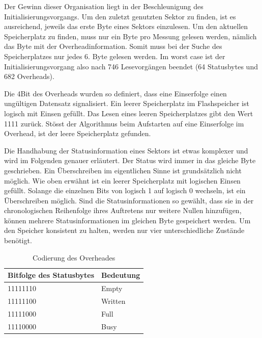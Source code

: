 Der Gewinn dieser Organisation liegt in der Beschleunigung des Initialisierungsvorgangs. Um den zuletzt genutzten Sektor zu finden, ist es ausreichend, jeweils das erste Byte eines Sektors einzulesen. Um den aktuellen Speicherplatz zu finden, muss nur ein Byte pro Messung gelesen werden, nämlich das Byte mit der Overheadinformation. Somit muss bei der Suche des Speicherplatzes nur jedes 6. Byte gelesen werden. Im \glqq worst case\grqq{}  ist der Initialisierungsvorgang also nach 746 Lesevorgängen beendet (64 Statusbytes und 682 Overheads).

Die 4Bit des Overheads wurden so definiert, dass eine Einserfolge einen ungültigen Datensatz signalisiert. Ein leerer Speicherplatz im Flashspeicher ist logisch mit Einsen gefüllt. Das Lesen eines leeren Speicherplatzes gibt den Wert  1111\grqq{}   zurück. Stösst der Algorithmus beim Aufstarten auf eine Einserfolge im Overhead, ist der leere Speicherplatz gefunden. 

Die Handhabung der Statusinformation eines Sektors ist etwas komplexer und wird im Folgenden genauer erläutert. Der Status wird immer in das gleiche Byte geschrieben. Ein Überschreiben im eigentlichen Sinne ist grundsätzlich nicht möglich. Wie oben erwähnt ist ein leerer Speicherplatz mit logischen Einsen gefüllt. Solange die einzelnen Bits von logisch 1 auf logisch 0 wechseln, ist ein Überschreiben möglich. Sind die Statusinformationen so gewählt, dass sie in der chronologischen Reihenfolge ihres Auftretens nur weitere Nullen hinzufügen, können mehrere Statusinformationen im gleichen Byte gespeichert werden. Um den Speicher konsistent zu halten, werden nur vier unterschiedliche Zustände benötigt.

\begin{table}[H]
\begin{center}
\begin{tabular}{|l|l|}
\hline
Bitfolge des Statusbytes & Bedeutung \\ \hline
11111110                 & Empty     \\ \hline
11111100                 & Written   \\ \hline
11111000                 & Full      \\ \hline
11110000                 & Busy      \\ \hline
\end{tabular}
\caption{Codierung des Overheades}
\label{tab:Codierung_des_Overheades}
\end{center}
\end{table}

